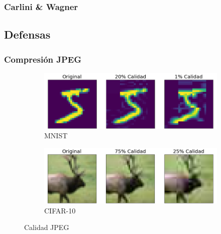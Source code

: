 \subsubsection{Carlini \& Wagner}
\cite{carlini2017evaluating} 

\subsection{Defensas}

\subsubsection{Compresión JPEG }

\begin{figure}[h]
    \centering
    \begin{subfigure}[b]{0.48\textwidth}
        \centering
        \includegraphics[width=\textwidth]{images/jpeg_qual_mnist.png}
        \caption{MNIST}
        \label{jpeg_cal_mnist}
    \end{subfigure}
    \hfill
    \begin{subfigure}[b]{0.48\textwidth}
        \centering
        \includegraphics[width=\textwidth]{images/jpeg_qual_cifar.png}
        \caption{CIFAR-10}
        \label{jpeg_cal_cifar}
    \end{subfigure}
    \caption{Calidad JPEG}
    \label{cal_JPEG}
\end{figure}
\cite{das2017keeping}